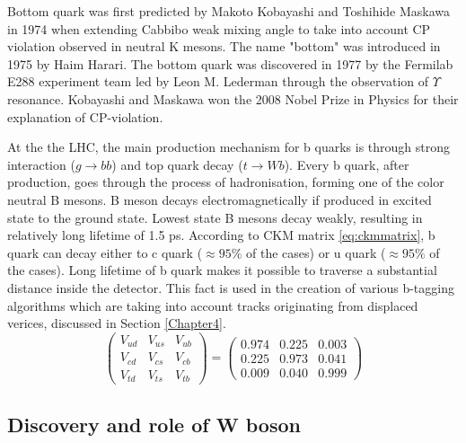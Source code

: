 Bottom quark was first predicted by Makoto Kobayashi and Toshihide Maskawa in 1974 when extending Cabbibo weak mixing angle to take into account CP violation observed in neutral K mesons. \cite{Kobayashi:1973fv} The name "bottom" was introduced in 1975 by Haim Harari. The bottom quark was discovered in 1977 by the Fermilab E288 experiment team led by Leon M. Lederman through the observation of $\Upsilon$ resonance. \cite{PhysRevLett.39.252} Kobayashi and Maskawa won the 2008 Nobel Prize in Physics for their explanation of CP-violation. 
\par At the the LHC, the main production mechanism for b quarks is through strong interaction ($g\rightarrow bb$) and top quark decay ($t\rightarrow Wb$). Every b quark, after production, goes through the process of hadronisation, forming one of the color neutral B mesons. B meson decays electromagnetically if produced in excited state to the ground state. Lowest state B mesons decay weakly, resulting in relatively long lifetime of 1.5 ps. According to CKM matrix \ref{eq:ckmmatrix}, b quark can decay either to c quark ($\approx 95\%$ of the cases) or u quark ($\approx 95\%$ of the cases). Long lifetime of b quark makes it possible to traverse a substantial distance inside the detector. This fact is used in the creation of various b-tagging algorithms which are taking into account tracks originating from displaced verices, discussed in Section \ref{Chapter4}.
\begin{equation} 

\begin{pmatrix}
V_{ud} & V_{us} & V_{ub} \\
V_{cd} & V_{cs} & V_{cb} \\
V_{td} & V_{ts} & V_{tb} 
\end{pmatrix} 
= \begin{pmatrix}
0.974 & 0.225 & 0.003 \\
0.225 & 0.973 & 0.041 \\
0.009 & 0.040 & 0.999 
\end{pmatrix} 

\label{eq:ckmmatrix} 
\end{equation}



\subsection{Discovery and role of W boson}


